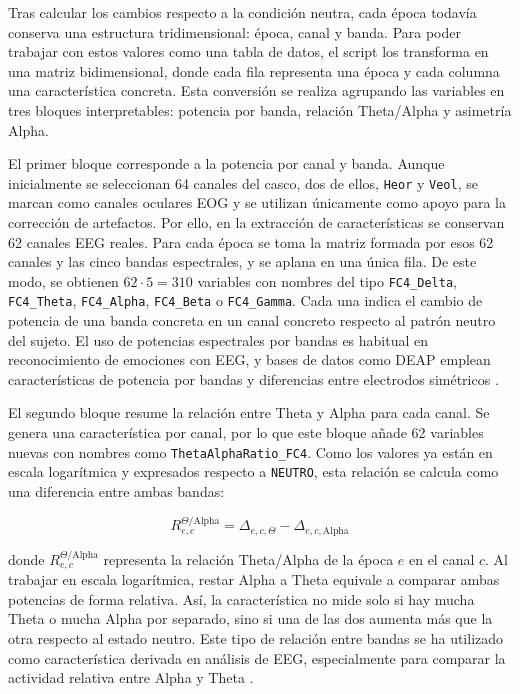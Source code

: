 Tras calcular los cambios respecto a la condición neutra, cada época todavía conserva una estructura tridimensional: época, canal y banda. Para poder trabajar con estos valores como una tabla de datos, el script los transforma en una matriz bidimensional, donde cada fila representa una época y cada columna una característica concreta. Esta conversión se realiza agrupando las variables en tres bloques interpretables: potencia por banda, relación Theta/Alpha y asimetría Alpha.

El primer bloque corresponde a la potencia por canal y banda. Aunque inicialmente se seleccionan 64 canales del casco, dos de ellos, \texttt{Heor} y \texttt{Veol}, se marcan como canales oculares \ac{EOG} y se utilizan únicamente como apoyo para la corrección de artefactos. Por ello, en la extracción de características se conservan 62 canales \ac{EEG} reales. Para cada época se toma la matriz formada por esos 62 canales y las cinco bandas espectrales, y se aplana en una única fila. De este modo, se obtienen \(62 \cdot 5 = 310\) variables con nombres del tipo \texttt{FC4\_Delta}, \texttt{FC4\_Theta}, \texttt{FC4\_Alpha}, \texttt{FC4\_Beta} o \texttt{FC4\_Gamma}. Cada una indica el cambio de potencia de una banda concreta en un canal concreto respecto al patrón neutro del sujeto. El uso de potencias espectrales por bandas es habitual en reconocimiento de emociones con \ac{EEG}, y bases de datos como DEAP emplean características de potencia por bandas y diferencias entre electrodos simétricos \cite{alarcao2019eeg,koelstra2012deap}.

El segundo bloque resume la relación entre Theta y Alpha para cada canal. Se genera una característica por canal, por lo que este bloque añade 62 variables nuevas con nombres como \texttt{ThetaAlphaRatio\_FC4}. Como los valores ya están en escala logarítmica y expresados respecto a \texttt{NEUTRO}, esta relación se calcula como una diferencia entre ambas bandas:

\begin{myequation}[H]
\[
R_{e,c}^{\Theta/\mathrm{Alpha}} = \Delta_{e,c,\Theta} - \Delta_{e,c,\mathrm{Alpha}}
\]
\caption{Relación Theta/Alpha calculada como diferencia en escala logarítmica.}
\label{eq:theta_alpha_ratio}
\end{myequation}

donde \(R_{e,c}^{\Theta/\mathrm{Alpha}}\) representa la relación Theta/Alpha de la época \(e\) en el canal \(c\). Al trabajar en escala logarítmica, restar Alpha a Theta equivale a comparar ambas potencias de forma relativa. Así, la característica no mide solo si hay mucha Theta o mucha Alpha por separado, sino si una de las dos aumenta más que la otra respecto al estado neutro. Este tipo de relación entre bandas se ha utilizado como característica derivada en análisis de \ac{EEG}, especialmente para comparar la actividad relativa entre Alpha y Theta \cite{raufi2022alphatheta}.

